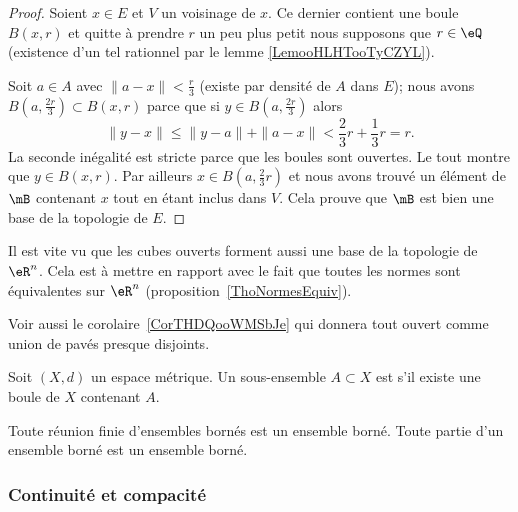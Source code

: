 \begin{proof}
    Soient \( x\in E\) et \( V\) un voisinage de \( x\). Ce dernier contient une boule \( B(x,r)\) et quitte à prendre \( r\) un peu plus petit nous supposons que \( r\in \eQ\) (existence d'un tel rationnel par le lemme \ref{LemooHLHTooTyCZYL}).

    Soit \( a\in A\) avec \( \| a-x \|<\frac{ r }{ 3 }\) (existe par densité de \( A\) dans \( E\)); nous avons \( B(a,\frac{ 2r }{ 3 })\subset B(x,r)\) parce que si \( y\in B( a,\frac{ 2r }{ 3 } )\) alors
    \begin{equation}
        \| y-x \|\leq \| y-a \|+\| a-x \|<\frac{ 2 }{ 3 }r+\frac{ 1 }{ 3 }r=r.
    \end{equation}
    La seconde inégalité est stricte parce que les boules sont ouvertes. Le tout montre que \( y\in B(x,r)\). Par ailleurs \( x\in B(a,\frac{ 2 }{ 3 }r)\) et nous avons trouvé un élément de \( \mB\) contenant \( x\) tout en étant inclus dans \( V\). Cela prouve que \( \mB\) est bien une base de la topologie de \( E\).
\end{proof}


\begin{remark}      \label{RemIPVLooHUXyeW}
    Il est vite vu que les cubes ouverts forment aussi une base de la topologie de \( \eR^n\). Cela est à mettre en rapport avec le fait que toutes les normes sont équivalentes sur \( \eR^n\) (proposition~\ref{ThoNormesEquiv}).


    Voir aussi le corolaire~\ref{CorTHDQooWMSbJe} qui donnera tout ouvert comme union de pavés presque disjoints.
\end{remark}

\begin{definition}\label{DefEnsembleBorne}
  Soit \( (X, d) \) un espace métrique. Un sous-ensemble $A \subset X$ est  s'il existe une boule de $X$ contenant $A$.
\end{definition}

\begin{proposition}
  Toute réunion finie d'ensembles bornés est un ensemble borné. Toute partie d'un ensemble borné est un ensemble borné.
\end{proposition}

\subsubsection{Continuité et compacité}

